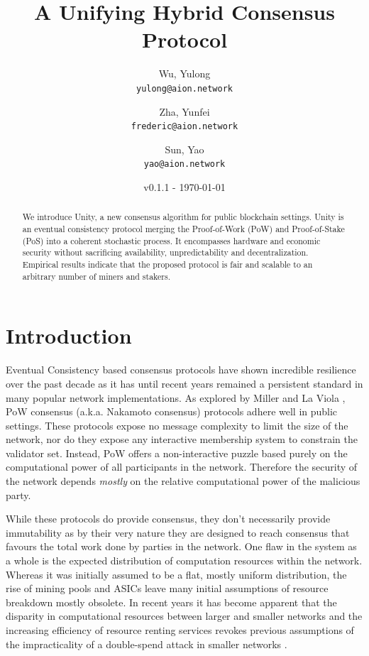 \documentclass[a4paper]{article}
\title{A Unifying Hybrid Consensus Protocol}
\author{
  Wu, Yulong\\
  \texttt{yulong@aion.network}
  \and
  Zha, Yunfei\\
  \texttt{frederic@aion.network}
  \and
  Sun, Yao\\
  \texttt{yao@aion.network}
}
\date{v0.1.1 - \today}
\begin{document}
\maketitle

\begin{abstract}
We introduce Unity, a new consensus algorithm for public blockchain settings. Unity is an eventual consistency protocol merging the Proof-of-Work (PoW) and Proof-of-Stake (PoS) into a coherent stochastic process. It encompasses hardware and economic security without sacrificing availability, unpredictability and decentralization. Empirical results indicate that the proposed protocol is fair and scalable to an arbitrary number of miners and stakers.
\end{abstract}
\clearpage

\tableofcontents
\clearpage

\section{Introduction}

Eventual Consistency based consensus protocols have shown incredible resilience over the past decade as it has until recent years remained a persistent standard in many popular network implementations. As explored by Miller and La Viola \cite{miller2014anonymous}, PoW consensus (a.k.a. Nakamoto consensus) protocols adhere well in public settings. These protocols expose no message complexity to limit the size of the network, nor do they expose any interactive membership system to constrain the validator set. Instead, PoW offers a non-interactive puzzle based purely on the computational power of all participants in the network. Therefore the security of the network depends \textit{mostly} on the relative computational power of the malicious party.

While these protocols do provide consensus, they don't necessarily provide immutability as by their very nature they are designed to reach consensus that favours the total work done by parties in the network. One flaw in the system as a whole is the expected distribution of computation resources within the network. Whereas it was initially assumed to be a flat, mostly uniform distribution, the rise of mining pools \cite{aliaga2018} and ASICs \cite{monerocrusher2019} leave many initial assumptions of resource breakdown mostly obsolete. In recent years it has become apparent that the disparity in computational resources between larger and smaller networks and the increasing efficiency of resource renting services revokes previous assumptions of the impracticality of a double-spend attack in smaller networks \cite{sinnige2018}.
\end{document}
